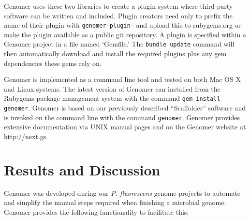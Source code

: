 \documentclass[10pt]{article}
\begin{document}
Genomer uses these two libraries to create a plugin system where third-party
software can be written and included. Plugin creators need only to prefix the
name of their plugin with \verb+genomer-plugin-+ and upload this to
rubygems.org or make the plugin available as a public git repository. A plugin
is specified within a Genomer project in a file named `Gemfile.' The
\verb+bundle update+ command will then automatically download and install the
required plugins plus any gem dependencies these gems rely on.

Genomer is implemented as a command line tool and tested on both Mac OS X and
Linux systems. The latest version of Genomer can installed from the Rubygems
package management system with the command \verb+gem install genomer+. Genomer
is based on our previously described ``Scaffolder'' software \cite{barton2012}
and is invoked on the command line with the command \verb+genomer+. Genomer
provides extensive documentation via UNIX manual pages and on the Genomer
website at http://next.gs.

\section*{Results and Discussion}

Genomer was developed during our \emph{P. fluorescens} genome projects to
automate and simplify the manual steps required when finishing a microbial
genome. Genomer provides the following functionality to facilitate this:
\end{document}
